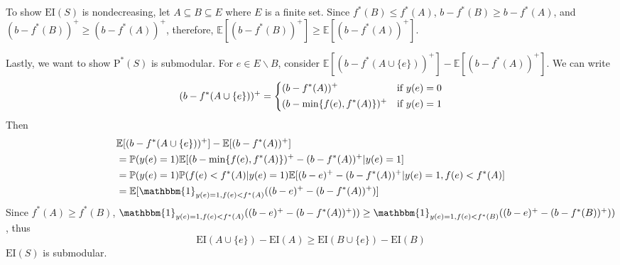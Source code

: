 \documentclass[opre,nonblindrev]{informs3} %
\newcommand{\E}{\mathbb{E}}
\newcommand{\EI}{\mathrm{EI}}
\newcommand{\PI}{\text{P}^*}
\begin{document}
To show $\EI(S)$ is nondecreasing, let $A \subseteq B \subseteq E$ where $E$ is a finite set. Since $f^*(B) \leq f^*(A)$, $b-f^*(B) \geq b-f^*(A)$, and $(b-f^*(B))^+ \geq (b-f^*(A))^+$, therefore, $\E[(b-f^*(B))^+] \geq \E[(b-f^*(A))^+]$.

Lastly, we want to show $\PI(S)$ is submodular. For $e \in E\backslash B$, consider $\E[(b-f^*(A \cup \{e\}))^+]-\E[(b-f^*(A))^+]$. We can write
\begin{equation*}
(b-f^*(A \cup \{e\}))^+ = \begin{dcases}
                         (b-f^*(A))^+ & \text{if $y(e)=0$} \\
                         (b-\min\{f(e),f^*(A)\})^+ & \text{if $y(e)=1$}
                         \end{dcases}
\end{equation*}
Then 
\begin{align*}
&\E[(b-f^*(A \cup \{e\}))^+]-\E[(b-f^*(A))^+] \\
&= \mathbb{P}(y(e)=1) \E[(b-\min\{f(e),f^*(A)\})^+ -(b-f^*(A))^+|y(e)=1]\\
&= \mathbb{P}(y(e)=1) \mathbb{P}(f(e)<f^*(A)|y(e)=1) \E[(b-e)^+-(b-f^*(A))^+|y(e)=1, f(e)<f^*(A)]\\
&= \E[ \mathbbm{1}_{y(e)=1, f(e)<f^*(A)} ((b-e)^+-(b-f^*(A))^+)]
\end{align*}
Since $f^*(A) \geq f^*(B)$, $\mathbbm{1}_{y(e)=1, f(e)<f^*(A)} ((b-e)^+-(b-f^*(A))^+)) \geq \mathbbm{1}_{y(e)=1, f(e)<f^*(B)} ((b-e)^+-(b-f^*(B))^+))$, thus
\begin{equation*}
\EI(A\cup \{e\})-\EI(A) \geq \EI(B\cup \{e\})-\EI(B)
\end{equation*}
$\EI(S)$ is submodular. \Halmos
\endproof
\end{document}

